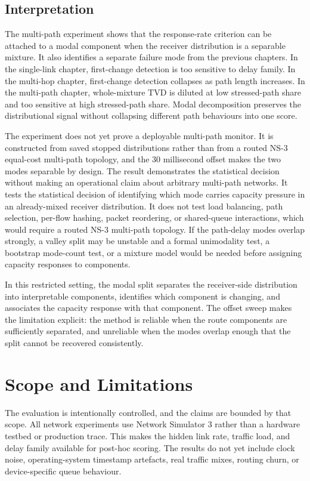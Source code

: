 \documentclass[a4paper,11pt]{report}
\begin{document}
\section{Interpretation}

The multi-path experiment shows that the response-rate criterion can be attached to a modal component when the receiver distribution is a separable mixture. It also identifies a separate failure mode from the previous chapters. In the single-link chapter, first-change detection is too sensitive to delay family. In the multi-hop chapter, first-change detection collapses as path length increases. In the multi-path chapter, whole-mixture TVD is diluted at low stressed-path share and too sensitive at high stressed-path share. Modal decomposition preserves the distributional signal without collapsing different path behaviours into one score.

The experiment does not yet prove a deployable multi-path monitor. It is constructed from saved stopped distributions rather than from a routed NS-3 equal-cost multi-path topology, and the 30 millisecond offset makes the two modes separable by design. The result demonstrates the statistical decision without making an operational claim about arbitrary multi-path networks. It tests the statistical decision of identifying which mode carries capacity pressure in an already-mixed receiver distribution. It does not test load balancing, path selection, per-flow hashing, packet reordering, or shared-queue interactions, which would require a routed NS-3 multi-path topology. If the path-delay modes overlap strongly, a valley split may be unstable and a formal unimodality test, a bootstrap mode-count test, or a mixture model would be needed before assigning capacity responses to components.

In this restricted setting, the modal split separates the receiver-side distribution into interpretable components, identifies which component is changing, and associates the capacity response with that component. The offset sweep makes the limitation explicit: the method is reliable when the route components are sufficiently separated, and unreliable when the modes overlap enough that the split cannot be recovered consistently.

\chapter{Scope and Limitations}
\label{sec:scope-limitations}

The evaluation is intentionally controlled, and the claims are bounded by that scope. All network experiments use Network Simulator 3 rather than a hardware testbed or production trace. This makes the hidden link rate, traffic load, and delay family available for post-hoc scoring. The results do not yet include clock noise, operating-system timestamp artefacts, real traffic mixes, routing churn, or device-specific queue behaviour.
\end{document}
